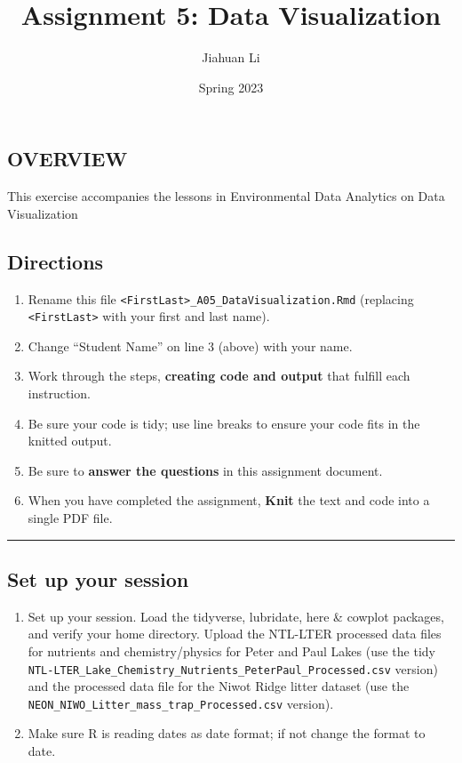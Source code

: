 \documentclass[
]{article}
\title{Assignment 5: Data Visualization}
\author{Jiahuan Li}
\date{Spring 2023}
\providecommand{\tightlist}{%
  \setlength{\itemsep}{0pt}\setlength{\parskip}{0pt}}
\begin{document}
\maketitle

\hypertarget{overview}{%
\subsection{OVERVIEW}\label{overview}}

This exercise accompanies the lessons in Environmental Data Analytics on
Data Visualization

\hypertarget{directions}{%
\subsection{Directions}\label{directions}}

\begin{enumerate}
\def\labelenumi{\arabic{enumi}.}
\tightlist
\item
  Rename this file
  \texttt{\textless{}FirstLast\textgreater{}\_A05\_DataVisualization.Rmd}
  (replacing \texttt{\textless{}FirstLast\textgreater{}} with your first
  and last name).
\item
  Change ``Student Name'' on line 3 (above) with your name.
\item
  Work through the steps, \textbf{creating code and output} that fulfill
  each instruction.
\item
  Be sure your code is tidy; use line breaks to ensure your code fits in
  the knitted output.
\item
  Be sure to \textbf{answer the questions} in this assignment document.
\item
  When you have completed the assignment, \textbf{Knit} the text and
  code into a single PDF file.
\end{enumerate}

\begin{center}\rule{0.5\linewidth}{0.5pt}\end{center}

\hypertarget{set-up-your-session}{%
\subsection{Set up your session}\label{set-up-your-session}}

\begin{enumerate}
\def\labelenumi{\arabic{enumi}.}
\item
  Set up your session. Load the tidyverse, lubridate, here \& cowplot
  packages, and verify your home directory. Upload the NTL-LTER
  processed data files for nutrients and chemistry/physics for Peter and
  Paul Lakes (use the tidy
  \texttt{NTL-LTER\_Lake\_Chemistry\_Nutrients\_PeterPaul\_Processed.csv}
  version) and the processed data file for the Niwot Ridge litter
  dataset (use the
  \texttt{NEON\_NIWO\_Litter\_mass\_trap\_Processed.csv} version).
\item
  Make sure R is reading dates as date format; if not change the format
  to date.
\end{enumerate}
\end{document}

